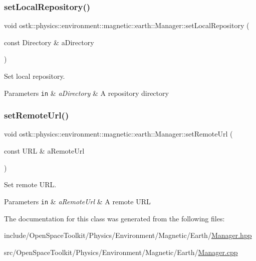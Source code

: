 \subsubsection{\texorpdfstring{set\+Local\+Repository()}{setLocalRepository()}}
{\footnotesize\ttfamily void ostk\+::physics\+::environment\+::magnetic\+::earth\+::\+Manager\+::set\+Local\+Repository (\begin{DoxyParamCaption}\item[{const Directory \&}]{a\+Directory }\end{DoxyParamCaption})}



Set local repository. 


\begin{DoxyParams}[1]{Parameters}
\mbox{\tt in}  & {\em a\+Directory} & A repository directory \\
\hline
\end{DoxyParams}
\mbox{\label{classostk_1_1physics_1_1environment_1_1magnetic_1_1earth_1_1_manager_aba782ea0211d716b5a79e440de6cd433}} 
\subsubsection{\texorpdfstring{set\+Remote\+Url()}{setRemoteUrl()}}
{\footnotesize\ttfamily void ostk\+::physics\+::environment\+::magnetic\+::earth\+::\+Manager\+::set\+Remote\+Url (\begin{DoxyParamCaption}\item[{const U\+RL \&}]{a\+Remote\+Url }\end{DoxyParamCaption})}



Set remote U\+RL. 


\begin{DoxyParams}[1]{Parameters}
\mbox{\tt in}  & {\em a\+Remote\+Url} & A remote U\+RL \\
\hline
\end{DoxyParams}


The documentation for this class was generated from the following files\+:\begin{DoxyCompactItemize}
\item 
include/\+Open\+Space\+Toolkit/\+Physics/\+Environment/\+Magnetic/\+Earth/\hyperlink{_environment_2_magnetic_2_earth_2_manager_8hpp}{Manager.\+hpp}\item 
src/\+Open\+Space\+Toolkit/\+Physics/\+Environment/\+Magnetic/\+Earth/\hyperlink{_environment_2_magnetic_2_earth_2_manager_8cpp}{Manager.\+cpp}\end{DoxyCompactItemize}
